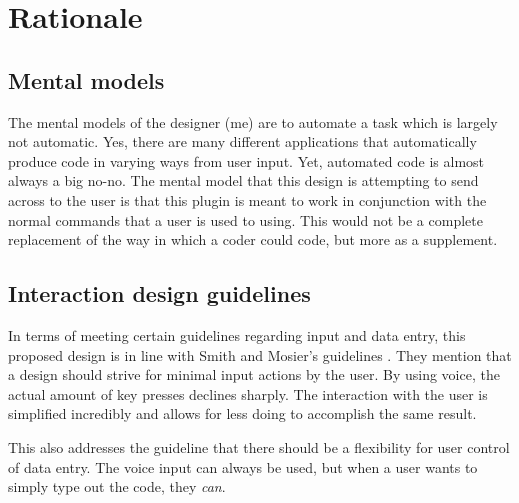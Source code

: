 \documentclass[11pt, oneside]{article}
\begin{document}

\section{Rationale}

	\subsection{Mental models}
	The mental models of the designer (me) are to automate a task which is largely not automatic. Yes, there are many different applications that automatically produce code in varying ways from user input. Yet, automated code is almost always a big no-no. The mental model that this design is attempting to send across to the user is that this plugin is meant to work in conjunction with the normal commands that a user is used to using. This would not be a complete replacement of the way in which a coder could code, but more as a supplement.

	\subsection{Interaction design guidelines}
	In terms of meeting certain guidelines regarding input and data entry, this proposed design is in line with Smith and Mosier's guidelines \cite{guidelines}. They mention that a design should strive for minimal input actions by the user. By using voice, the actual amount of key presses declines sharply. The interaction with the user is simplified incredibly and allows for less doing to accomplish the same result.

	This also addresses the guideline that there should be a flexibility for user control of data entry. The voice input can always be used, but when a user wants to simply type out the code, they \textit{can}.
\end{document}
